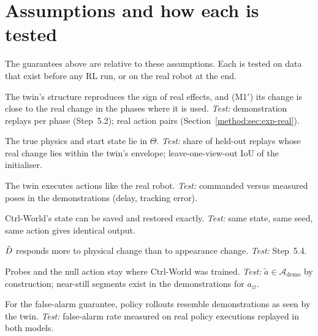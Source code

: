 \section{Assumptions and how each is tested}\label{method:sec:assumptions}
The guarantees above are relative to these assumptions. Each is tested on data that exist before any RL run, or on the real robot at the end.
\begin{assumption}\label{method:as:adequacy}
The twin's structure reproduces the sign of real effects, and (M1$'$) its change is close to the real change in the phases where it is used. \emph{Test:} demonstration replays per phase (Step~5.2); real action pairs (Section~\ref{method:sec:exp-real}).
\end{assumption}
\begin{assumption}[Coverage]\label{method:as:coverage}
The true physics and start state lie in $\Theta$. \emph{Test:} share of held-out replays whose real change lies within the twin's envelope; leave-one-view-out IoU of the initialiser.
\end{assumption}
\begin{assumption}\label{method:as:ctrl}
The twin executes actions like the real robot. \emph{Test:} commanded versus measured poses in the demonstrations (delay, tracking error).
\end{assumption}
\begin{assumption}\label{method:as:restore}
Ctrl-World's state can be saved and restored exactly. \emph{Test:} same state, same seed, same action gives identical output.
\end{assumption}
\begin{assumption}\label{method:as:rep}
$\tilde D$ responds more to physical change than to appearance change. \emph{Test:} Step~5.4.
\end{assumption}
\begin{assumption}[Support]\label{method:as:support}
Probes and the null action stay where Ctrl-World was trained. \emph{Test:} $\tilde a\in\mathcal A_{\mathrm{demo}}$ by construction; near-still segments exist in the demonstrations for $a_\varnothing$.
\end{assumption}
\begin{assumption}[Exchangeability]\label{method:as:exch}
For the false-alarm guarantee, policy rollouts resemble demonstrations as seen by the twin. \emph{Test:} false-alarm rate measured on real policy executions replayed in both models.
\end{assumption}


